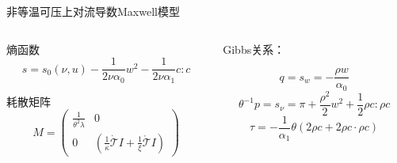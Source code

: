 \documentclass[mathserif]{beamer}
\begin{document}

\begin{frame}{非等温可压上对流导数Maxwell模型}
\begin{columns}
\begin{column}{0.45\linewidth}
\pause
\begin{block}{熵函数}
$$s = s_0(\nu,u)  - \frac{1}{2 \nu \alpha_0} w^2 - \frac{1}{2  \nu \alpha_1} c:c$$
\end{block}
\pause
\begin{block}{耗散矩阵}
	\begin{equation*}
		M = \left( \begin{array}{ccc} 
			\frac{1}{\theta^2 \lambda} & 0 \\
			0 & (\frac{1}{\kappa}\dot{\mathcal{T}} I +  \frac{1}{\xi}\mathring{\mathcal{T}} I  )
		\end{array} \right)
	\end{equation*}
\end{block}
\end{column}
\pause
\begin{column}{0.5\linewidth}
\begin{block}{}
Gibbs关系：

$$q=s_w=-\frac{\rho w}{\alpha_0}$$
$$\theta^{-1} p = s_\nu = \pi +\frac{\rho^2}{2} w^2 + \frac{1}{2} \rho c: \rho c$$
$$\tau = - \frac{1}{\alpha_1}  \theta (2 \rho c + 2 \rho c \cdot \rho c)$$
\end{block}
\end{column}
\end{columns}
\end{frame}
\end{document}
